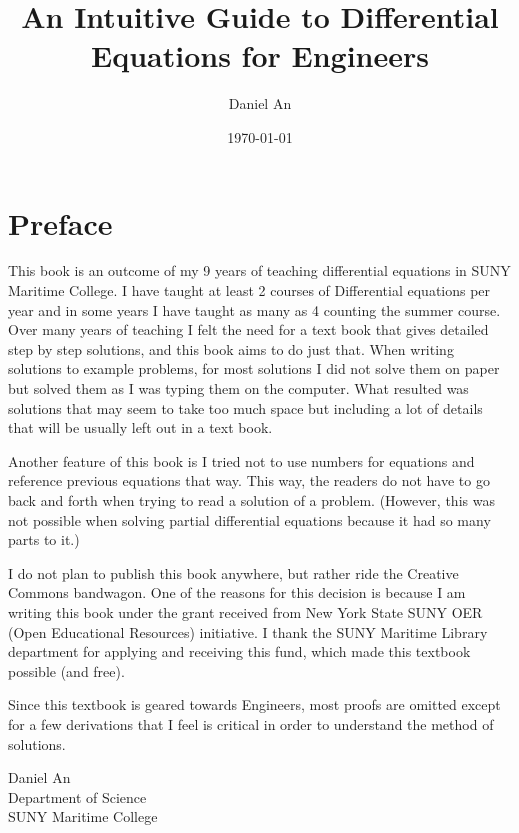 \documentclass[12pt]{report}
\title{An Intuitive Guide to Differential Equations for Engineers}
\author{Daniel An}
\date{\today}
\begin{document}
	\maketitle
	\doclicenseThis
	\tableofcontents{}
	
	\chapter*{Preface}
	
	This book is an outcome of my 9 years of teaching differential equations in SUNY Maritime College. I have taught at least 2 courses of Differential equations per year and in some years I have taught as many as 4 counting the summer course. Over many years of teaching I felt the need for a text book that gives detailed step by step solutions, and this book aims to do just that. When writing solutions to example problems, for most solutions I did not solve them on paper but solved them as I was typing them on the computer. What resulted was solutions that may seem to take too much space but including a lot of details that will be usually left out in a text book.
	 
	Another feature of this book is I tried not to use numbers for equations and reference previous equations that way. This way, the readers do not have to go back and forth when trying to read a solution of a problem. (However, this was not possible when solving partial differential equations because it had so many parts to it.) 
	 
	I do not plan to publish this book anywhere, but rather ride the Creative Commons bandwagon. One of the reasons for this decision is because I am writing this book under the grant received from New York State SUNY OER (Open Educational Resources) initiative. I thank the SUNY Maritime Library department for applying and receiving this fund, which made this textbook possible (and free).
	
	Since this textbook is geared towards Engineers, most proofs are omitted except for a few derivations that I feel is critical in order to understand the method of solutions. 
	
	\vspace*{4cm}
	
\begin{flushright}
	Daniel An\\
	Department of Science\\	
	SUNY Maritime College\\
\end{flushright} 
	
\end{document}
